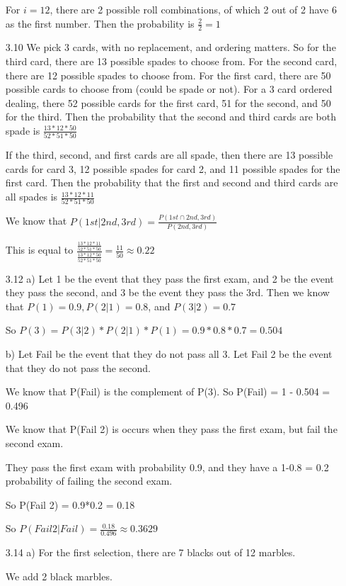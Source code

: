\documentclass[11pt]{article}
\begin{document}
\begin{itemize}
	For $i = 12$, there are 2 possible roll combinations, of which 2 out of 2 have 6 as the first number. Then the probability is $\frac{2}{2} = 1$
\item[3.10]
	We pick 3 cards, with no replacement, and ordering matters. So for the third card, there are 13 possible spades to choose from. For the second card, there are 12 possible spades to choose from. For the first card, there are 50 possible cards to choose from (could be spade or not). For a 3 card ordered dealing, there 52 possible cards for the first card, 51 for the second, and 50 for the third. Then the probability that the second and third cards are both spade is $\frac{13*12*50}{52*51*50}$ 

	If the third, second, and first cards are all spade, then there are 13 possible cards for card 3, 12 possible spades for card 2, and 11 possible spades for the first card. Then the probability that the first and second and third cards are all spades is $\frac{13*12*11}{52*51*50}$

	We know that $P(1st|2nd,3rd) = \frac{P(1st \cap 2nd,3rd)}{P(2nd,3rd)}$

	This is equal to $\frac{\frac{13*12*11}{52*51*50}}{\frac{13*12*50}{52*51*50}} = \frac{11}{50} \approx 0.22$
\item[3.12]
	a) Let 1 be the event that they pass the first exam, and 2 be the event they pass the second, and 3 be the event they pass the 3rd. Then we know that $P(1) = 0.9, P(2|1) = 0.8$, and $P(3|2) = 0.7$

	So $P(3) = P(3|2) * P(2|1) * P(1) = 0.9 * 0.8 * 0.7 = 0.504$

	b) Let Fail be the event that they do not pass all 3. Let Fail 2 be the event that they do not pass the second.

	We know that P(Fail) is the complement of P(3). So P(Fail) = 1 - 0.504 = 0.496

	We know that P(Fail 2) is occurs when they pass the first exam, but fail the second exam.

	They pass the first exam with probability 0.9, and they have a 1-0.8 = 0.2 probability of failing the second exam.

	So P(Fail 2) = 0.9*0.2 = 0.18

	So $P(Fail 2 | Fail) = \frac{0.18}{0.496} \approx 0.3629$
	
\item[3.14]
	a) For the first selection, there are 7 blacks out of 12 marbles.

	We add 2 black marbles. 


\end{itemize}
\end{document}
